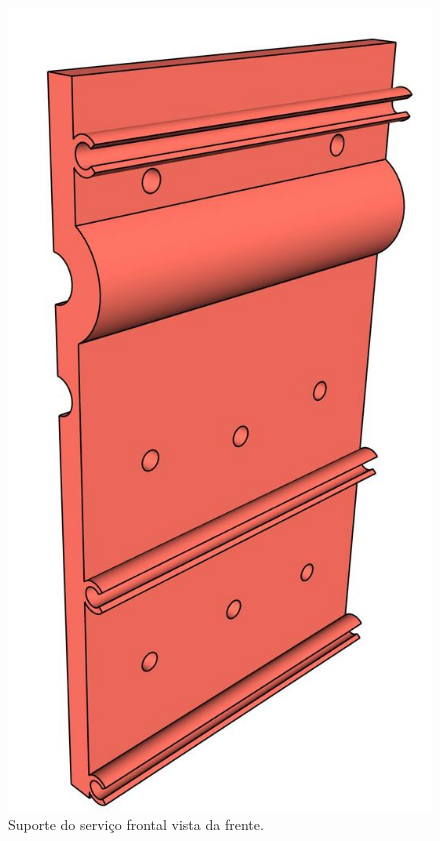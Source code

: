 \begin{figure}[H]
\centering
\caption{Suporte do serviço frontal vista da frente.}\label{fig:ressuporteservicofrontalf}
\includegraphics[scale = 0.4]{figuras/ressuporteservicofrontalf}
\end{figure}


